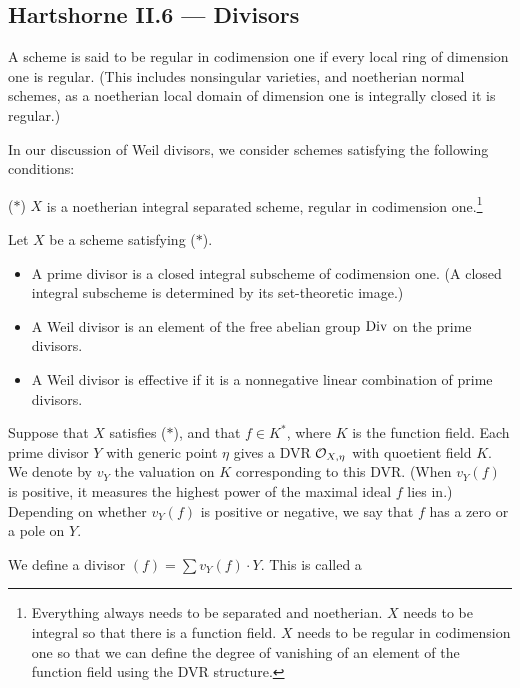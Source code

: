 \documentclass[11pt]{article}
\begin{document}
\begin{II.5 Sheaves of Modules}
\section*{Hartshorne II.6 --- Divisors}
\begin{itemise}
\item A scheme is said to be regular in
codimension one if every local ring of dimension one is regular. {\small (This
includes nonsingular varieties, and noetherian normal schemes, as a noetherian
local domain of dimension one is integrally closed \Iff it is regular.)}
\item In our discussion of Weil divisors, we consider schemes satisfying the
following conditions:
\begin{itemise}
\item[($*$)] $X$ is a noetherian integral separated scheme, regular in
codimension one.\footnote{Everything always needs to be separated and
noetherian. $X$ needs to be integral so that there is a function field. $X$
needs to be regular in codimension one so that we can define the degree of
vanishing of an element of the function field using the DVR
structure.}
\end{itemise}
\item Let $X$ be a scheme satisfying ($*$). 
\begin{itemize}\squishlist
\item A prime divisor is a closed integral subscheme of
codimension one. {\small (A closed integral subscheme is determined by its
set-theoretic image.)}
\item A  Weil divisor is an element of the free abelian
group $\textup{Div}$ on the prime divisors.
\item A Weil divisor is effective  if it is a
nonnegative linear combination of prime divisors.
\end{itemize}
\item Suppose that $X$ satisfies ($*$), and that $f\in K^*$, where $K$ is the
function field. Each prime divisor $Y$ with generic point $\eta$ gives a DVR
$\mathcal{O}_{X,\eta}$ with quoetient field $K$. We denote by $v_Y$ the valuation on
$K$ corresponding to this DVR. {\small (When $v_Y(f)$ is positive, it measures
the highest power of the maximal ideal $f$ lies in.)} Depending on whether
$v_Y(f)$ is positive or negative, we say that $f$ has a zero or a pole on $Y$.
\item We define a divisor $(f)=\sum v_Y(f)\cdot Y$. This is called a

\end{itemise}
\end{II.5 Sheaves of Modules}
\end{document}
